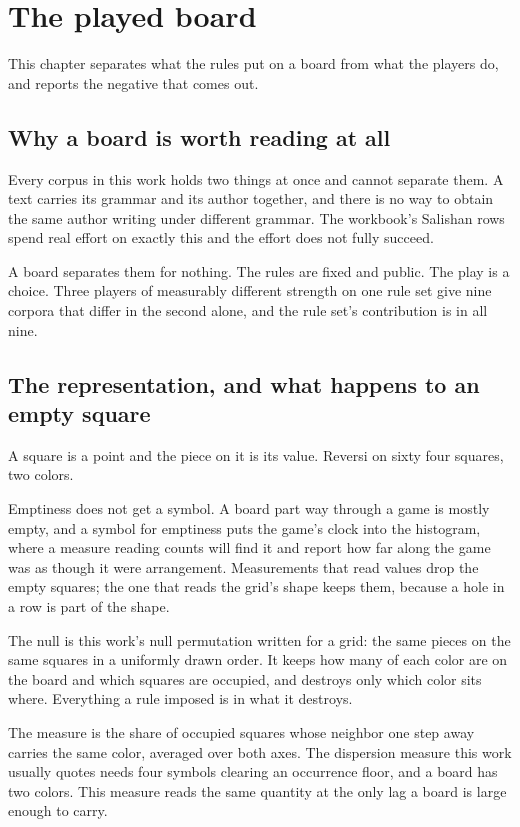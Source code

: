 \chapter{The played board}

This chapter separates what the rules put on a board from what the players do, and reports the
negative that comes out.

\section{Why a board is worth reading at all}

Every corpus in this work holds two things at once and cannot separate them. A text carries its
grammar and its author together, and there is no way to obtain the same author writing under
different grammar. The workbook's Salishan rows~\cite{src:Quigg-orior-workbook} spend real effort on exactly this and the effort does
not fully succeed.

A board separates them for nothing. The rules are fixed and public. The play is a choice. Three
players of measurably different strength on one rule set give nine corpora that differ in the second
alone, and the rule set's contribution is in all nine.

\section{The representation, and what happens to an empty square}

A square is a point and the piece on it is its value. Reversi on sixty four squares, two colors.

Emptiness does not get a symbol. A board part way through a game is mostly empty, and a symbol for
emptiness puts the game's clock into the histogram, where a measure reading counts will find it and
report how far along the game was as though it were arrangement. Measurements that read values drop
the empty squares; the one that reads the grid's shape keeps them, because a hole in a row is part
of the shape.

The null is this work's null permutation written for a grid: the same pieces on the same squares in
a uniformly drawn order. It keeps how many of each color are on the board and which squares are
occupied, and destroys only which color sits where. Everything a rule imposed is in what it
destroys.

The measure is the share of occupied squares whose neighbor one step away carries the same color,
averaged over both axes. The dispersion measure this work usually quotes needs four symbols clearing
an occurrence floor, and a board has two colors. This measure reads the same quantity at the only lag
a board is large enough to carry.

